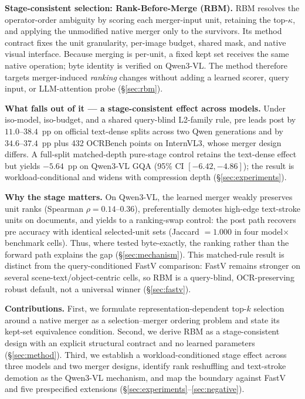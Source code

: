 \documentclass[journal]{IEEEtran}
\begin{document}
\textbf{Stage-consistent selection: Rank-Before-Merge (RBM).} RBM resolves the
operator-order ambiguity by scoring each merger-input unit, retaining the
top-$\kappa$, and applying the unmodified native merger only to the survivors.
Its method contract fixes the unit granularity, per-image budget, shared mask,
and native visual interface. Because merging is per-unit, a fixed kept set
receives the same native operation; byte identity is verified on Qwen3-VL. The
method therefore targets merger-induced \emph{ranking} changes without adding a
learned scorer, query input, or LLM-attention probe (\S\ref{sec:rbm}).

\textbf{What falls out of it --- a stage-consistent effect across models.} Under iso-model,
iso-budget, and a shared query-blind L2-family rule, pre leads post by
$11.0$--$38.4$~pp on
official text-dense splits across two Qwen generations and by
$34.6$--$37.4$~pp plus 432 OCRBench points on InternVL3, whose merger design
differs. A full-split matched-depth pure-stage control retains the text-dense
effect but yields $-5.64$~pp on Qwen3-VL GQA (95\% CI
$[-6.42,-4.86]$); the result is workload-conditional and widens with
compression depth (\S\ref{sec:experiments}).

\textbf{Why the stage matters.} On Qwen3-VL, the learned merger weakly preserves
unit ranks (Spearman $\rho=0.14$--$0.36$), preferentially demotes high-edge
text-stroke units on documents, and yields to a ranking-swap control: the post
path recovers pre accuracy with identical selected-unit sets (Jaccard $=1.000$
in four model$\times$benchmark cells). Thus, where tested byte-exactly, the
ranking rather than the forward path explains the gap (\S\ref{sec:mechanism}).
This matched-rule result is distinct from the query-conditioned FastV comparison:
FastV remains stronger on several scene-text/object-centric cells, so RBM is a
query-blind, OCR-preserving robust default, not a universal winner
(\S\ref{sec:fastv}).

\textbf{Contributions.}
First, we formulate representation-dependent top-$k$ selection around a native
merger as a selection--merger ordering problem and state its kept-set
equivalence condition. Second, we derive RBM as a stage-consistent design with
an explicit structural contract and no learned parameters (\S\ref{sec:method}).
Third, we establish a workload-conditioned stage effect across three models and
two merger designs, identify rank reshuffling and text-stroke demotion as the
Qwen3-VL mechanism, and map the boundary against FastV and five prespecified
extensions (\S\ref{sec:experiments}--\ref{sec:negative}).
\end{document}

